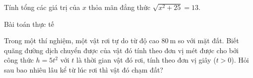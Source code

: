 \begin{vd}%
	Tính tổng các giá trị của $x$ thỏa mãn đẳng thức $\sqrt{x^2 + 25}= 13$.
\end{vd}

\begin{dang}{Bài toán thực tế}
\end{dang}
\begin{vd}
	Trong một thí nghiệm, một vật rơi tự do từ độ cao $80\ \mathrm{m}$ so với mặt đất. Biết quãng đường dịch chuyển được của vật đó tính theo đơn vị mét được cho bởi công thức $h=5t^2$ với $t$ là thời gian vật đó rơi, tính theo đơn vị giây ($t>0$). Hỏi sau bao nhiêu lâu kể từ lúc rơi thì vật đó chạm đất?
\end{vd}
